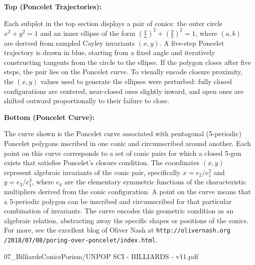 \begin{SideNotePage}{
  \textbf{Top (Poncelet Trajectories):} \par
  Each subplot in the top section displays a pair of conics: the outer circle $x^2 + y^2 = 1$ and an inner ellipse of the form $\left(\frac{x}{a}\right)^2 + \left(\frac{y}{b}\right)^2 = 1$, where $(a, b)$ are derived from sampled Cayley invariants $(x, y)$. A five-step Poncelet trajectory is drawn in blue, starting from a fixed angle and iteratively constructing tangents from the circle to the ellipse. If the polygon closes after five steps, the pair lies on the Poncelet curve. To visually encode closure proximity, the $(x, y)$ values used to generate the ellipses were perturbed: fully closed configurations are centered, near-closed ones slightly inward, and open ones are shifted outward proportionally to their failure to close.

  \vspace{1.5em}
  \textbf{Bottom (Poncelet Curve):} \par
  The curve shown is the Poncelet curve associated with pentagonal (5-periodic) Poncelet polygons inscribed in one conic and circumscribed around another. Each point on this curve corresponds to a set of conic pairs for which a closed 5-gon exists that satisfies Poncelet’s closure condition. The coordinates $(x, y)$ represent algebraic invariants of the conic pair, specifically $x = e_2 / e_1^2$ and $y = e_3 / e_1^3$, where $e_k$ are the elementary symmetric functions of the characteristic multipliers derived from the conic configuration. A point on the curve means that a 5-periodic polygon can be inscribed and circumscribed for that particular combination of invariants. The curve encodes this geometric condition as an algebraic relation, abstracting away the specific shapes or positions of the conics. For more, see the excellent blog of Oliver Nash at \texttt{http://olivernash.org\\/2018/07/08/poring-over-poncelet/index.html}.
}{07_BilliardsConicsPorism/UNPOP SCI - BILLIARDS - v11.pdf}
\end{SideNotePage}
